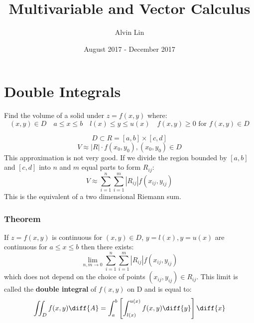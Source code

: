 \documentclass[letterpaper, 12pt]{math}
\title{Multivariable and Vector Calculus}
\author{Alvin Lin}
\date{August 2017 - December 2017}
\begin{document}
\maketitle

\section*{Double Integrals}
Find the volume of a solid under \( z = f(x,y) \) where:
\[ (x,y)\in D \quad a\le x\le b \quad l(x)\le y\le u(x) \quad
  f(x,y)\ge 0\text{ for }f(x,y)\in D \]
\begin{center}
\end{center}
\[ D \subset R = [a,b]\times[c,d] \]
\[ V \approx |R|\cdot f(x_0,y_0), (x_0,y_0)\in D \]
This approximation is not very good. If we divide the region bounded by
\( [a,b] \) and \( [c,d] \) into \( n \) and \( m \) equal parts to form
\( R_{ij} \):
\[ V \approx \sum_{i=1}^{n}\sum_{i=1}^{m}|R_{ij}|f(x_{ij},y_{ij}) \]
This is the equivalent of a two dimensional Riemann sum.

\subsubsection*{Theorem}
If \( z = f(x,y) \) is continuous for \( (x,y)\in D \), \( y = l(x), y = u(x)
\) are continuous for \( a\le x\le b \) then there exists:
\[ \lim_{n,m\to0}\sum_{i=1}^{n}\sum_{i=1}^{m}|R_{ij}|f(x_{ij},y_{ij}) \]
which does not depend on the choice of points \( (x_{ij},y_{ij})\in R_{ij} \).
This limit is called the \textbf{double integral} of \( f(x,y) \) on D and
is equal to:
\[ \iint_{D}f(x,y)\diff{A} =
  \int_{a}^{b}\left[\int_{l(x)}^{u(x)}f(x,y)\diff{y}\right]\diff{x} \]
\end{document}
